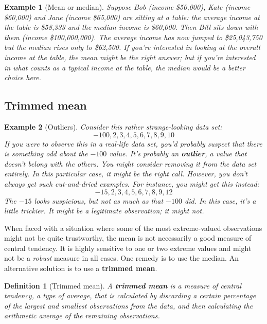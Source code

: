 \documentclass[
  11pt,
]{book}
\theoremstyle{indenteddefinition}
\newtheorem{definition}{Definition}[chapter]
\theoremstyle{indenteddefinition}
\newtheorem{example}{Example}[chapter]
\theoremstyle{definition}
\theoremstyle{definition}
\theoremstyle{remark}
\begin{document}
\begin{example}[Mean or median]
\protect\hypertarget{exm:exmeanmedian}{}\label{exm:exmeanmedian}Suppose Bob (income \$50,000), Kate (income \$60,000) and Jane (income \$65,000) are sitting at a table: the average income at the table is \$58,333 and the median income is \$60,000. Then Bill sits down with them (income \$100,000,000). The average income has now jumped to \$25,043,750 but the median rises only to \$62,500. If you're interested in looking at the overall income at the table, the mean might be the right answer; but if you're interested in what counts as a typical income at the table, the median would be a better choice here.
\end{example}

\hypertarget{trimmedmean}{%
\subsection{Trimmed mean}\label{trimmedmean}}

\begin{example}[Outliers]
\protect\hypertarget{exm:exoutliers}{}\label{exm:exoutliers}Consider this rather strange-looking data set:
\[
-100,2,3,4,5,6,7,8,9,10
\]
If you were to observe this in a real-life data set, you'd probably suspect that there is something odd about the \(-100\) value. It's probably an \textbf{outlier}, a value that doesn't belong with the others. You might consider removing it from the data set entirely. In this particular case, it might be the right call. However, you don't always get such cut-and-dried examples. For instance, you might get this instead:
\[
-15,2,3,4,5,6,7,8,9,12
\]
The \(-15\) looks suspicious, but not as much as that \(-100\) did. In this case, it's a little trickier. It \emph{might} be a legitimate observation; it might not.
\end{example}

When faced with a situation where some of the most extreme-valued observations might not be quite trustworthy, the mean is not necessarily a good measure of central tendency. It is highly sensitive to one or two extreme values and might not be a \emph{robust} measure in all cases. One remedy is to use the median. An alternative solution is to use a \textbf{trimmed mean}.

\begin{definition}[Trimmed mean]
\protect\hypertarget{def:deftrimmedmean}{}\label{def:deftrimmedmean}A \textbf{trimmed mean} is a measure of central tendency, a type of average, that is calculated by discarding a certain percentage of the largest and smallest observations from the data, and then calculating the arithmetic average of the remaining observations.
\end{definition}
\end{document}
